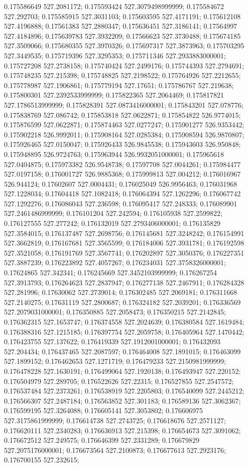 0.175586649 527.2081172; 0.175593424 527.3079498999999; 0.175584672 527.292703; 0.175585915 527.3031103; 0.175603595 527.4171191; 0.175612108 527.4196888; 0.17561383 527.2880347; 0.175636451 527.3186141; 0.17564997 527.4184896; 0.175639783 527.3932209; 0.17566623 527.3730488; 0.175674185 527.3509066; 0.175680355 527.3970326; 0.175697317 527.3873963; 0.175703295 527.3449535; 0.175719396 527.3295353; 0.175711346 527.2933883000001; 0.175727208 527.2738158; 0.175740424 527.2499176; 0.175744393 527.2794691; 0.175748235 527.215398; 0.175748825 527.2198522; 0.175764926 527.2212655; 0.175778987 527.1906861; 0.175779194 527.17651; 0.175786767 527.219638; 0.175800301 527.2392533999999; 0.175822365 527.2064469; 0.175817821 527.1786513999999; 0.175828391 527.0873416000001; 0.175843201 527.078776; 0.175838769 527.086742; 0.175853818 527.0622871; 0.175854822 526.9774015; 0.175876599 527.0622871; 0.175874463 527.0277247; 0.175901277 526.9353442; 0.175902218 526.9992011; 0.175908164 527.0285384; 0.175908594 526.9870807; 0.175926465 527.0150047; 0.175926433 526.9845538; 0.175943603 526.950848; 0.175948895 526.9724763; 0.175963944 526.9932051000001; 0.175965618 527.0404875; 0.175973382 526.9548738; 0.17597708 527.0044261; 0.175984477 527.0197158; 0.176001727 526.9885368; 0.175999813 527.004212; 0.176016967 526.944124; 0.17602607 527.0004431; 0.176025049 526.9956463; 0.176031968 527.1228034; 0.17604418 527.1082418; 0.176064394 527.1262296; 0.176067742 527.1292276; 0.176086043 527.236598; 0.176095417 527.248333; 0.176089901 527.2461486999999; 0.176101204 527.242594; 0.176105938 527.2599822; 0.176127555 527.277242; 0.176132019 527.2793406000001; 0.176135829 527.3584015; 0.176137487 527.2698756; 0.176145681 527.3248242; 0.176154991 527.3662819; 0.176167681 527.3565599; 0.176184006 527.3931781; 0.176192598 527.3521058; 0.176191769 527.3567741; 0.176202897 527.3050376; 0.176227351 527.3887239; 0.176223892 527.4057267; 0.176234031 527.3758326000001; 0.17624865 527.342341; 0.176245669 527.3452103999999; 0.176267254 527.3913793; 0.176264623 527.2837947; 0.176277138 527.2467911; 0.176284328 527.281996; 0.17630062 527.2739014; 0.176302485 527.2069181; 0.176311668 527.2140275; 0.17631119 527.2800687; 0.176324182 527.2039201; 0.176336569 527.2079031000001; 0.176350885 527.2058473; 0.176350215 527.2142845; 0.176362315 527.1653747; 0.176374558 527.2024639; 0.176380584 527.1619484; 0.176388316 527.1215185; 0.176397754 527.2059758; 0.176405964 527.1470442; 0.176423755 527.137622; 0.176419339 527.1912001000001; 0.176432093 527.204434; 0.176437465 527.2087597; 0.176464008 527.1891015; 0.176463099 527.1899152; 0.176462653 527.1271719; 0.176479233 527.2150981999999; 0.176478228 527.1630191; 0.176499064 527.1920138; 0.176493947 527.220152; 0.176504979 527.289705; 0.176522626 527.22315; 0.176527855 527.2547572; 0.176537484 527.2373261; 0.176538919 527.2205803; 0.176540099 527.2445212; 0.176566307 527.2487184; 0.176563852 527.301183; 0.176589136 527.3062367; 0.176599195 527.3264088; 0.176605141 527.3053802; 0.176606975 527.3175861999999; 0.176614738 527.2743725; 0.176618676 527.2571127; 0.176620111 527.2340283; 0.176636913 527.215398; 0.176654673 527.3091062; 0.176672512 527.249575; 0.176646399 527.2331289; 0.176679829 527.2075176000001; 0.176673564 527.2100873; 0.176677613 527.2923176; 0.176700155 527.232615; 